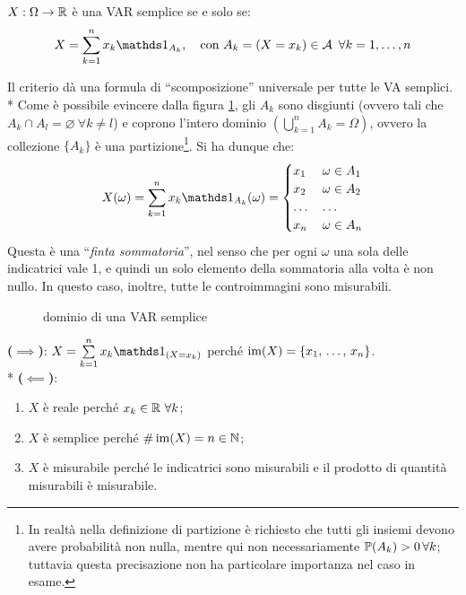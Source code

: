 \medskip
\begin{prop}
  $X:\Omega \to \mathbb R$ è una VAR semplice se e solo se:
  $$X = \sum\limits_{k=1}^{n} x_k \Ind_{A_k}, \quad
  \text{con } A_k = (X = x_k) \in \Ac \enspace \forall k = 1,\dots,n$$
\end{prop}
Il criterio dà una formula di ``scomposizione'' universale per tutte le VA semplici. \\*
Come è possibile evincere dalla figura \ref{fig-var-semplice-dom}, gli $A_k$ sono disgiunti (ovvero tali che $A_k \cap A_l = \varnothing \ \forall k \neq l$) e coprono l'intero dominio $\left(\bigcup\limits_{k=1}^{n} A_k = \Omega\right)$, ovvero la collezione $\{A_k\}$ è una partizione\footnote{In realtà nella definizione di partizione è richiesto che tutti gli insiemi devono avere probabilità non nulla, mentre qui non necessariamente $\mathbb P(A_k) > 0 \, \forall k$; tuttavia questa precisazione non ha particolare importanza nel caso in esame.}.
Si ha dunque che:
$$X(\omega) = \sum\limits_{k=1}^{n} x_k \Ind_{A_k}(\omega) =
\begin{cases}
  x_1 &  \omega \in A_1\\
  x_2 &  \omega \in A_2\\
  \dots & \dots \\
  x_n &  \omega \in A_n
\end{cases}$$
Questa è una ``\emph{finta sommatoria}'', nel senso che per ogni $\omega$ una sola delle indicatrici vale 1, e quindi un solo elemento della sommatoria alla volta è non nullo.
In questo caso, inoltre, tutte le controimmagini sono misurabili.

\begin{figure}[H]
  \centering
  \def\drect {(-1.5, -1.5) rectangle (3, 1.5)}
  \caption{dominio di una VAR semplice}
  \label{fig-var-semplice-dom}
\end{figure}

\begin{dimo}
\textbf{($\implies$)}: $X = \sum\limits_{k=1}^{n} x_k \Ind_{(X = x_k)}$ perché $\operatorname{im}(X) = \{x_1, \, \dots, \, x_n\}$. \\*
\textbf{($\impliedby$)}:
\begin{enumerate}
  \item $X$ è reale perché $x_k \in \mathbb R \ \forall k$;
  \item $X$ è semplice perché $\#\operatorname{im}(X) = n \in \mathbb N$;
  \item $X$ è misurabile perché le indicatrici sono misurabili e il prodotto di quantità misurabili è misurabile. \qedhere
\end{enumerate}
\end{dimo}

